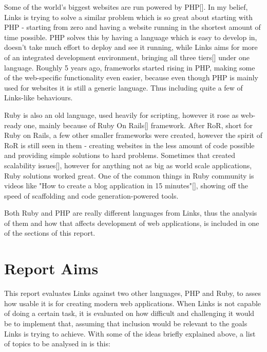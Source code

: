 Some of the world's biggest websites are run powered by PHP[]. In my belief, Links is trying to solve a similar problem which is so great about starting with PHP - starting from zero and having a website running in the shortest amount of time possible. PHP solves this by having a language which is easy to develop in, doesn't take much effort to deploy and see it running, while Links aims for more of an integrated development environment, bringing all three tiers[] under one language. Roughly 5 years ago, frameworks started rising in PHP, making some of the web-specific functionality even easier, because even though PHP is mainly used for websites it is still a generic language. Thus including quite a few of Links-like behaviours. 

Ruby is also an old language, used heavily for scripting, however it rose as web-ready one, mainly because of Ruby On Rails[] framework. After RoR, short for Ruby on Rails, a few other smaller frameworks were created, however the spirit of RoR is still seen in them - creating websites in the less amount of code possible and providing simple solutions to hard problems. Sometimes that created scalability issues[], however for anything not as big as world scale applications, Ruby solutions worked great. One of the common things in Ruby community is videos like "How to create a blog application in 15 minutes"[], showing off the speed of scaffolding and code generation-powered tools. 

Both Ruby and PHP are really different languages from Links, thus the analysis of them and how that affects development of web applications, is included in one of the sections of this report. 

\section{Report Aims}

This report evaluates Links against two other languages, PHP and Ruby, to asses how usable it is for creating modern web applications. When Links is not capable of doing a certain task, it is evaluated on how difficult and challenging it would be to implement that, assuming that inclusion would be relevant to the goals Links is trying to achieve. With some of the ideas briefly explained above, a list of topics to be analysed in is this:

